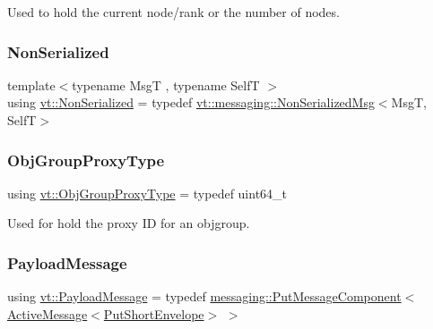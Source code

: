 Used to hold the current node/rank or the number of nodes. 

\mbox{\label{namespacevt_a378e4a02213923b4ba1c3f9d2a1424c7}} 
\subsubsection{\texorpdfstring{Non\+Serialized}{NonSerialized}}
{\footnotesize\ttfamily template$<$typename MsgT , typename SelfT $>$ \\
using \hyperlink{namespacevt_a378e4a02213923b4ba1c3f9d2a1424c7}{vt\+::\+Non\+Serialized} = typedef \hyperlink{structvt_1_1messaging_1_1_non_serialized_msg}{vt\+::messaging\+::\+Non\+Serialized\+Msg}$<$MsgT, SelfT$>$}

\mbox{\label{namespacevt_ad7cae989df485fccca57f0792a880a8e}} 
\subsubsection{\texorpdfstring{Obj\+Group\+Proxy\+Type}{ObjGroupProxyType}}
{\footnotesize\ttfamily using \hyperlink{namespacevt_ad7cae989df485fccca57f0792a880a8e}{vt\+::\+Obj\+Group\+Proxy\+Type} = typedef uint64\+\_\+t}



Used for hold the proxy ID for an objgroup. 

\mbox{\label{namespacevt_a89a92229c5622b855c02c549f83a1a68}} 
\subsubsection{\texorpdfstring{Payload\+Message}{PayloadMessage}}
{\footnotesize\ttfamily using \hyperlink{namespacevt_a89a92229c5622b855c02c549f83a1a68}{vt\+::\+Payload\+Message} = typedef \hyperlink{structvt_1_1messaging_1_1_put_message_component}{messaging\+::\+Put\+Message\+Component}$<$ \hyperlink{namespacevt_a00eb67bd138395b6a4f744fab3fa0678}{Active\+Message}$<$\hyperlink{namespacevt_a8d7a7de9e76bfea1600009a775b7298c}{Put\+Short\+Envelope}$>$ $>$}

